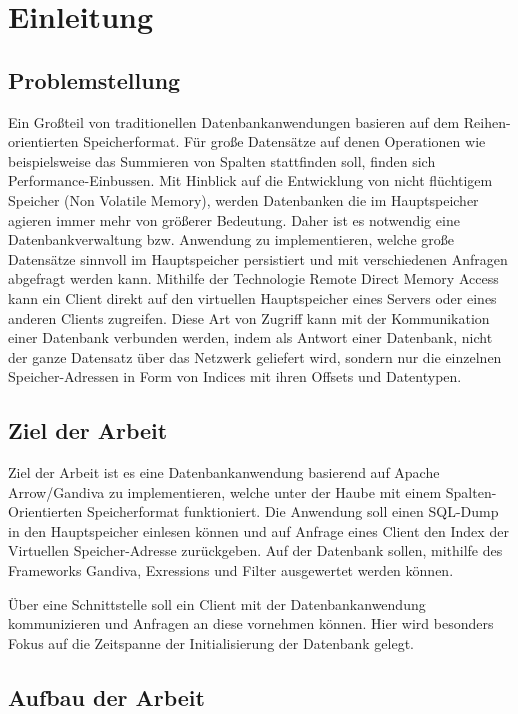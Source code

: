 \chapter{Einleitung}
\label{Einleitung}

\section{Problemstellung}
Ein Großteil von traditionellen Datenbankanwendungen basieren auf dem Reihen-orientierten Speicherformat. Für große Datensätze auf denen Operationen wie beispielsweise das Summieren von Spalten stattfinden soll, finden sich Performance-Einbussen.
Mit Hinblick auf die Entwicklung von nicht flüchtigem Speicher (Non Volatile Memory), werden Datenbanken die im Hauptspeicher agieren immer mehr von größerer Bedeutung. Daher ist es notwendig eine Datenbankverwaltung bzw. Anwendung zu implementieren, welche große Datensätze sinnvoll im Hauptspeicher persistiert und mit verschiedenen Anfragen abgefragt werden kann.
Mithilfe der Technologie Remote Direct Memory Access kann ein Client direkt auf den virtuellen Hauptspeicher eines Servers oder eines anderen Clients zugreifen. Diese Art von Zugriff kann mit der Kommunikation einer Datenbank verbunden werden, indem als Antwort einer Datenbank, nicht der ganze Datensatz über das Netzwerk geliefert wird, sondern nur die einzelnen Speicher-Adressen in Form von Indices mit ihren Offsets und Datentypen.

\section{Ziel der Arbeit}
Ziel der Arbeit ist es eine Datenbankanwendung basierend auf Apache Arrow/Gandiva zu implementieren, welche unter der Haube mit einem Spalten-Orientierten Speicherformat funktioniert. Die Anwendung soll einen SQL-Dump in den Hauptspeicher einlesen können und auf Anfrage eines Client den Index der Virtuellen Speicher-Adresse zurückgeben. Auf der Datenbank sollen, mithilfe des Frameworks Gandiva, Exressions und Filter ausgewertet werden können.

Über eine Schnittstelle soll ein Client mit der Datenbankanwendung kommunizieren und Anfragen an diese vornehmen können. Hier wird besonders Fokus auf die Zeitspanne der Initialisierung der Datenbank gelegt.


\section{Aufbau der Arbeit}

